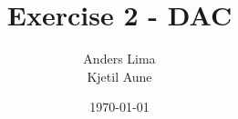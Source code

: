 \newcommand{\mytitle}{Exercise 2 - DAC}
\newcommand{\mygroupnumber}{29}
\newcommand{\myauthor}{Anders Lima\\Kjetil Aune\\}

\title{\mytitle}
\author{\myauthor}
\date{\today}
